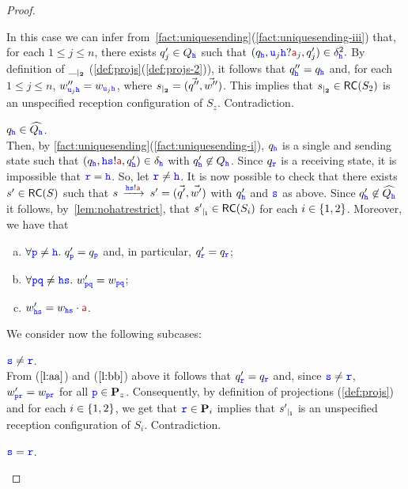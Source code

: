 \begin{proof}
\begin{description}
\begin{itemize}
\begin{itemize}
In this case we can infer from~\cref{fact:uniquesending}(\ref{fact:uniquesending-iii}) that, for each $1\leq j\leq n$, there exists $q'_j \in Q_{\HH}$
such that $(q_\HH,\ttu_j\HH?\msg[a]_j,q'_j)\in\delta^2_\HH.$
By definition of $\restrict{\_}{2}$ (\cref{def:projs}(\ref{def:projs-2})), 
it follows that $q''_\hh=q_\hh$ and, for each $1\leq j\leq n$,
$w''_{\ttu_j\hh}=w_{\ttu_j\hh}$, where 
$\restrict{s}{2}=(\vec{q''},\vec{w''})$. 
 This implies that $\restrict{s}{2}\in \RS(S_2)$ is an  unspecified reception configuration of $S_z$. Contradiction.
\end{itemize}
\end{itemize}
\item 
${q}_\HH\in \widehat{Q_\HH}$.\\ 
Then, by \cref{fact:uniquesending}(\ref{fact:uniquesending-i}),
${q}_\HH$ is a single and sending state such that $({q}_\HH,\HH\tts!\msg[a],q'_\HH)\in{\delta}_\HH$ with $q'_\HH \not\in Q_{\HH}$. 
Since $q_\ttr$ is a receiving state, it is impossible that $\ttr=\HH$.
So, let $\ttr\neq\HH$. 
It is now possible to check that  there exists $s'\in \RS(S)$ such that
$s\lts{\HH\tts!\msg[a]}s'=(\vec{q'},\vec{w'})$ with $q'_\HH$ and $\tts$ as above.
Since $q'_\HH\not\in \widehat{Q_\HH}$ it
follows, by~\cref{lem:nohatrestrict}, that $\restrict{s'}{i} \in \RS(S_i)$ for each $i\in\Set{1,2}$.
Moreover, we have that 
\begin{enumerate}[a)]
\item
\label{l:aa}
$\forall \ttp\neq\HH.\ q'_\ttp = {q}_\ttp$ and,
in particular, $q'_\ttr = {q}_\ttr$;
\item
\label{l:bb}
$\forall \ttp\ttq \neq \HH\tts.\ w'_{\ttp\ttq} = {w}_{\ttp\ttq}$;
\item
\label{l:cc}
$w'_{\HH\tts} = {w}_{\HH\tts}\cdot \msg[a]$.
\end{enumerate}
We consider now the following subcases:
\begin{description}
\item
 {\it $\tts \neq \ttr$}.  \\
From ($\ref{l:aa}$) and ($\ref{l:bb}$) above it follows that  $q'_\ttr = {q}_\ttr$
and, since  $\tts \neq \ttr$, $w'_{\ttp\ttr} = {w}_{\ttp\ttr}$ for all $\ttp \in \roles_z$.
Consequently, by definition of projections (\cref{def:projs}) and  for each $i\in\Set{1,2}$, 
we get that $\ttr\in\roles_i$ implies that $\restrict{s'}{i}$ is an unspecified reception configuration of $S_i$. Contradiction.
%
\item
 {\it $\tts = \ttr$}.  \\

\end{description}
\end{description}
\end{proof}
